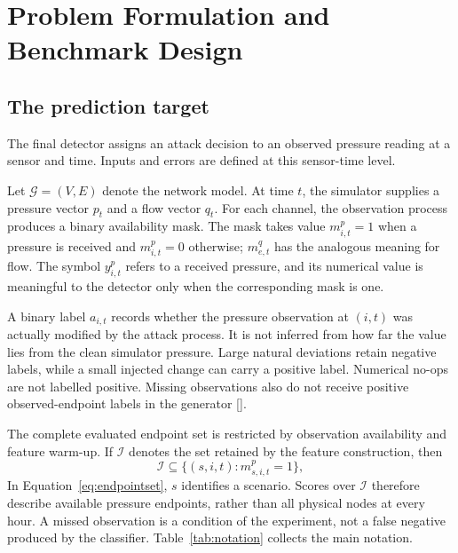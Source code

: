 \chapter{Problem Formulation and Benchmark Design}
\label{ch:benchmark}

\section{The prediction target}
The final detector assigns an attack decision to an observed pressure reading at a sensor and time. Inputs and errors are defined at this sensor-time level.

Let $\mathcal G=(V,E)$ denote the network model. At time $t$, the simulator supplies a pressure vector $p_t$ and a flow vector $q_t$. For each channel, the observation process produces a binary availability mask. The mask takes value $m^p_{i,t}=1$ when a pressure is received and $m^p_{i,t}=0$ otherwise; $m^q_{e,t}$ has the analogous meaning for flow. The symbol $y^p_{i,t}$ refers to a received pressure, and its numerical value is meaningful to the detector only when the corresponding mask is one.

A binary label $a_{i,t}$ records whether the pressure observation at $(i,t)$ was actually modified by the attack process. It is not inferred from how far the value lies from the clean simulator pressure. Large natural deviations retain negative labels, while a small injected change can carry a positive label. Numerical no-ops are not labelled positive. Missing observations also do not receive positive observed-endpoint labels in the generator [].

The complete evaluated endpoint set is restricted by observation availability and feature warm-up. If $\mathcal I$ denotes the set retained by the feature construction, then
\begin{equation}
 \mathcal I\subseteq\{(s,i,t):m^p_{s,i,t}=1\},\label{eq:endpointset}
\end{equation}
In Equation~\eqref{eq:endpointset}, $s$ identifies a scenario. Scores over $\mathcal I$ therefore describe available pressure endpoints, rather than all physical nodes at every hour. A missed observation is a condition of the experiment, not a false negative produced by the classifier. Table~\ref{tab:notation} collects the main notation.

